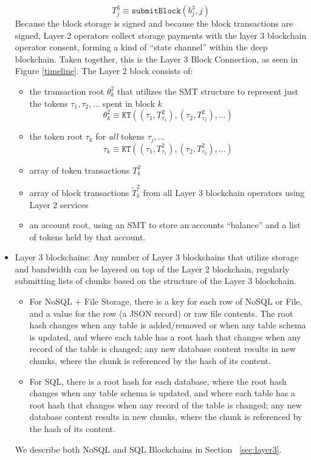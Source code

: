 \documentclass{article}
\newcommand{\blockhash}[2]{b^{#1}_{#2}}
\newcommand{\transaction}[2]{T_{#2}^#1}
\newcommand{\blocktransaction}[2]{\tilde{T}_{#2}^#1}
\newcommand{\transactionroot}[2]{\theta_{#2}^#1}
\newcommand{\tokenroot}[1]{\tau_{#1}}
\newcommand{\submitblock}[2]{\texttt{submitBlock}(#2, #1)}
\begin{document}
\begin{itemize}
\begin{equation}
\transaction{3}{j} \equiv \submitblock{j}{\blockhash{3}{j}}
\end{equation}
Because the block storage is signed and because the block transactions are signed, Layer 2 operators  collect storage payments with the layer 3 blockchain operator consent, forming a kind of ``state channel'' within the deep blockchain.  Taken together, this is the Layer 3 Block Connection, as seen in Figure \ref{timeline}.  The Layer 2 block consists of:
\begin{itemize}
\item the transaction root $\transactionroot{2}{k}$ that utilizes the SMT structure to represent just the tokens $\tau_1, \tau_2, \ldots$ spent in block $k$
\begin{equation}
\transactionroot{2}{k} \equiv \texttt{KT}( (\tau_1, \transaction{2}{\tau_1}), (\tau_2, \transaction{2}{\tau_2}), ... )
\end{equation}
\item the token root $\tokenroot{k}$  for {\em all} tokens $\tau_j, ...$
\begin{equation}
\tokenroot{k} \equiv \texttt{KT}( (\tau_1, \transaction{2}{\tau_1}), (\tau_2, \transaction{2}{\tau_2}), ... )
\end{equation}
\item array of token transactions  $\transaction{2}{k}$
\item array of block transactions  $\blocktransaction{2}{k}$ from all Layer 3 blockchain operators using Layer 2 services
\item an account root, using an SMT to store an accounts ``balance'' and a list of tokens held by that account.
\end{itemize}

\item Layer 3 blockchains:  Any number of Layer 3 blockchains that utilize storage and bandwidth can be layered on top of the Layer 2 blockchain, regularly submitting lists of chunks based on the structure of the Layer 3 blockchain.
\begin{itemize}
    \item For NoSQL + File Storage, there is a key for each row of NoSQL or File, and a value for the row (a JSON record) or raw file contents.   The root hash changes when any table is added/removed or when any table schema is updated, and where each table has a root hash that changes when any record of the table is changed; any new database content results in new chunks, where the chunk is referenced by the hash of its content.
    \item For SQL, there is a root hash for each database, where the root hash changes when any table schema is updated, and where each table has a root hash that changes when any record of the table is changed; any new database content results in new chunks, where the chunk is referenced by the hash of its content.
\end{itemize}
We describe both NoSQL and SQL Blockchains in Section ~\ref{sec:layer3}.
\end{itemize}
\end{document}
